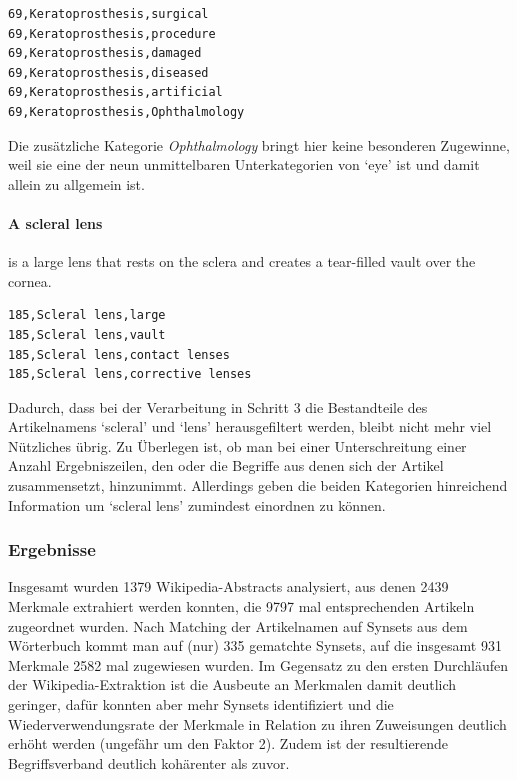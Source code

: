 \documentclass[pagesize,DIV=calc,12pt,draft]{scrreprt}
\begin{document}
\begin{lstlisting}
69,Keratoprosthesis,surgical 
69,Keratoprosthesis,procedure
69,Keratoprosthesis,damaged 
69,Keratoprosthesis,diseased
69,Keratoprosthesis,artificial 
69,Keratoprosthesis,Ophthalmology
\end{lstlisting}

Die zusätzliche Kategorie \emph{Ophthalmology} bringt hier keine besonderen Zugewinne, weil sie eine der neun unmittelbaren Unterkategorien von `eye' ist und damit allein zu allgemein ist.

\paragraph{A scleral lens}
is a large lens that rests on the sclera and creates a tear-filled vault
over the cornea.

\begin{lstlisting}
185,Scleral lens,large 
185,Scleral lens,vault 
185,Scleral lens,contact lenses 
185,Scleral lens,corrective lenses
\end{lstlisting}

Dadurch, dass bei der Verarbeitung in Schritt 3 die Bestandteile des
Artikelnamens `scleral' und `lens' herausgefiltert werden, bleibt nicht
mehr viel Nützliches übrig. Zu Überlegen ist, ob man bei einer
Unterschreitung einer Anzahl Ergebniszeilen, den oder die Begriffe aus
denen sich der Artikel zusammensetzt, hinzunimmt. Allerdings geben die
beiden Kategorien hinreichend Information um `scleral lens' zumindest
einordnen zu können.

\subsubsection{Ergebnisse}

Insgesamt wurden 1379 Wikipedia-Abstracts analysiert, aus denen 2439
Merkmale extrahiert werden konnten, die 9797 mal entsprechenden Artikeln
zugeordnet wurden. Nach Matching der Artikelnamen auf Synsets aus dem
Wörterbuch kommt man auf (nur) 335 gematchte Synsets, auf die insgesamt
931 Merkmale 2582 mal zugewiesen wurden. Im Gegensatz zu den ersten
Durchläufen der Wikipedia-Extraktion ist die Ausbeute an Merkmalen damit
deutlich geringer, dafür konnten aber mehr Synsets identifiziert und die
Wiederverwendungsrate der Merkmale in Relation zu ihren Zuweisungen
deutlich erhöht werden (ungefähr um den Faktor 2). Zudem ist der
resultierende Begriffsverband deutlich kohärenter als zuvor.
\end{document}
